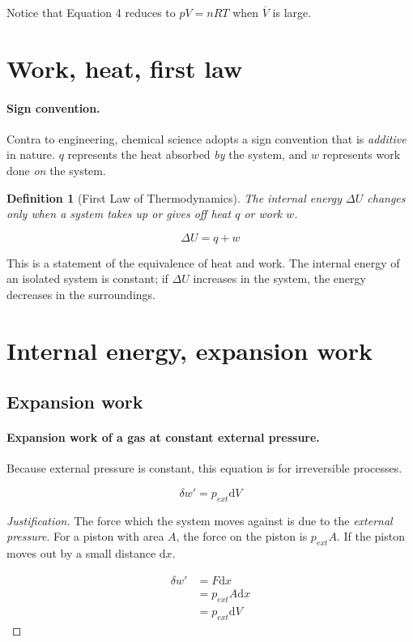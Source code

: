 \documentclass{article}
\numberwithin{theorem}{section}
\numberwithin{corollary}{section}
\numberwithin{postulate}{section}
\numberwithin{lemma}{section}
\newtheorem{definition}{Definition}
\numberwithin{definition}{section}
\newenvironment{justification} {\begin{proof}[Justification]} {\end{proof}}
\begin{document}
Notice that Equation 4 reduces to $pV = nRT$ when $\overline{V}$ is large.

\section{Work, heat, first law}

\paragraph{Sign convention. }Contra to engineering, chemical science adopts
a sign convention that is \textit{additive} in nature. $q$ represents the heat
absorbed \textit{by} the system, and $w$ represents work done \textit{on} the
system.


\begin{definition}[First Law of Thermodynamics]
The internal energy $\Delta U$ changes only when a system takes up or gives off
heat $q$ or work $w$.

  \begin{equation}
    \Delta U = q + w
  \end{equation}
\end{definition}

This is a statement of the equivalence of heat and work. The internal energy of
an isolated system is constant; if $\Delta U$ increases in the system, the
energy decreases in the surroundings.

\section{Internal energy, expansion work}

\subsection{Expansion work} 

\paragraph{Expansion work of a gas at constant external pressure.} Because
external pressure is constant, this equation is for irreversible processes.

\begin{equation}
  \delta w' = p_{ext} \mathrm{d}V
\end{equation}

\begin{justification}
  The force which the system moves against is due to the \textit{external
  pressure}. For a piston with area $A$, the force on the piston is $p_{ext}A$. If the
  piston moves out by a small distance $\mathrm{d}x$.

  \begin{equation*}
  \begin{split}
    \delta w' & = F\mathrm{d}x \\
    & =  p_{ext} A \mathrm{d}x \\
    & = p_{ext} \mathrm{d}V
  \end{split}
\end{equation*}

\end{justification}
\end{document}
